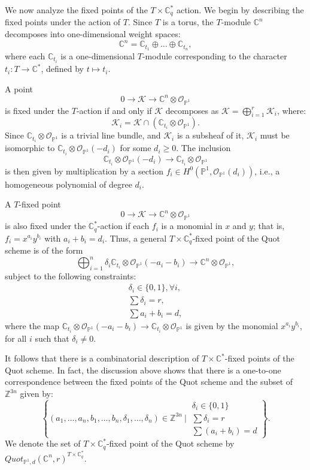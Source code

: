\documentclass{amsart}
\begin{document}
We now analyze the fixed points of the $T \times \mathbb{C}_q^*$ action. We begin by describing the fixed points under the action of $T$. Since $T$ is a torus, the $T$-module $\mathbb{C}^n$ decomposes into one-dimensional weight spaces:
\[
\mathbb{C}^n = \mathbb{C}_{t_1} \oplus \dots \oplus \mathbb{C}_{t_n},
\]
 where each $\mathbb{C}_{t_i}$ is a one-dimensional $T$-module corresponding to the character $t_i :T \to \mathbb{C}^*$, defined by $t \mapsto t_i$.

A point
\[
0 \to \mathcal{K} \to \mathbb{C}^n \otimes \mathcal{O}_{\mathbb{P}^1}
\]
 is fixed under the $T$-action if and only if $\mathcal{K}$ decomposes as $\mathcal{K} = \bigoplus_{i=1}^r \mathcal{K}_i$, where: 
 \[
 \mathcal{K}_i = \mathcal{K} \cap (\mathbb{C}_{t_i} \otimes \mathcal{O}_{\mathbb{P}^1}).
 \]
  Since $\mathbb{C}_{t_i} \otimes \mathcal{O}_{\mathbb{P}^1}$ is a trivial line bundle, and  $\mathcal{K}_i$ is a subsheaf of it, $\mathcal{K}_i$ must be isomorphic to $\mathbb{C}_{t_i} \otimes \mathcal{O}_{\mathbb{P}^1}(-d_i)$ for some $d_i \geq 0$. The inclusion
\[
\mathbb{C}_{t_i} \otimes \mathcal{O}_{\mathbb{P}^1}(-d_i) \to \mathbb{C}_{t_i} \otimes \mathcal{O}_{\mathbb{P}^1}
\]
is then  given by multiplication by a section $f_i \in H^0(\mathbb{P}^1,\mathcal{O}_{\mathbb{P}^1}(d_i))$, i.e., a homogeneous polynomial of degree $d_i$. 

 A $T$-fixed point
 \[
 0 \to \mathcal{K} \to \mathbb{C}^n \otimes \mathcal{O}_{\mathbb{P}^1}
 \]
is also fixed under the $\mathbb{C}_q^*$-action if each $f_i$ is a monomial in $x$ and $y$; that is, $f_i=x^{a_i}y^{b_i}$ with $a_i+b_i=d_i$. Thus, a general $T \times \mathbb{C}_q^*$-fixed point of the Quot scheme is of the form
\begin{equation}\label{1}
 \bigoplus_{i=1}^n \delta_i\mathbb{C}_{t_i} \otimes \mathcal{O}_{\mathbb{P}^1}(-a_i-b_i) \to \mathbb{C}^n \otimes \mathcal{O}_{\mathbb{P}^1},
\end{equation}
subject to the following constraints:
\begin{align*}
\delta_i \in \{0,1\} , \forall i, \\
    \sum \delta_i = r, \\
    \sum a_i+b_i = d,
\end{align*}
where the map $\mathbb{C}_{t_i} \otimes \mathcal{O}_{\mathbb{P}^1}(-a_i-b_i) \to \mathbb{C}_{t_i} \otimes \mathcal{O}_{\mathbb{P}^1}$ is given by the monomial $x^{a_i}y^{b_i}$, for all $i$ such that $\delta_i \ne 0$.

It follows that there is a combinatorial description of $T \times \mathbb{C}^*$-fixed points of the Quot scheme. In fact, the discussion above shows that there is a one-to-one correspondence between the fixed points of the Quot scheme and the subset of $\mathbb{Z}^{3n}$ given by: 
\[
\left\{
(a_1,\dots,a_n,b_1,\dots,b_n,\delta_1,\dots,\delta_n) \in \mathbb{Z}^{3n}
\ \Bigg|\
\begin{array}{l}
\delta_i \in \{0,1\}\\
\sum \delta_i = r\\
\sum (a_i + b_i) = d
\end{array}
\right\}.
\]
We denote the set of $T \times \mathbb{C}_q^*$-fixed point of the Quot scheme by $Quot_{\mathbb{P}^1,d}(\mathbb{C}^n,r)^{T \times \mathbb{C}_q^*}$.
\end{document}
